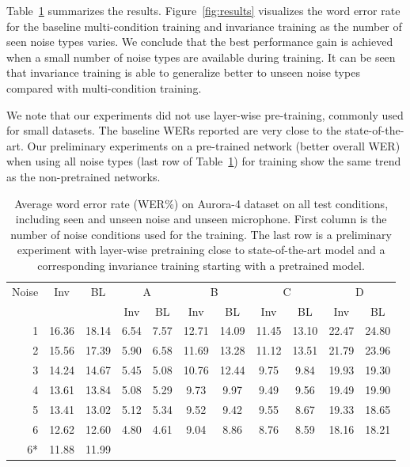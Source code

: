 \documentclass{article}
\begin{document}
Table~\ref{tab:results} summarizes the results. Figure~\ref{fig:results} visualizes the word error rate for the baseline multi-condition training and invariance training as the number of seen noise types varies. We conclude that the best performance
gain is achieved when a small number of noise types are available during training. It can be seen that invariance training is able to generalize better to unseen noise types compared with multi-condition training.

We note that our experiments did not use layer-wise pre-training, commonly used for small
datasets. The baseline WERs reported are very close to the state-of-the-art. %
Our preliminary experiments on a pre-trained network (better overall WER) when using all noise types (last row of Table~\ref{tab:results}) for training show the same trend as the non-pretrained networks.

\begin{table}
    \centering
    \caption{Average word error rate (WER\%) on Aurora-4 dataset on all test conditions,
        including seen and unseen noise and unseen microphone. First column
        is the number of noise conditions used for the training. The last row is a 
        preliminary experiment with layer-wise pretraining close to state-of-the-art
        model and a corresponding invariance training starting with a pretrained model.}
    \label{tab:results}
    \begin{tabular}{r|cc||cc|cc|cc|cc}
        Noise       &Inv&BL&  \multicolumn{2}{c|}{A} & \multicolumn{2}{c|}{B} & \multicolumn{2}{c|}{C} & \multicolumn{2}{c}{D}\\
               & & &  Inv & BL & Inv & BL & Inv & BL & Inv & BL\\
    \hline
    1           &16.36        &18.14 &6.54&7.57    &12.71& 14.09   & 11.45&   13.10    & 22.47 &   24.80    \\
    2           &15.56        &17.39 &5.90&  6.58 &   11.69   &13.28   &11.12   &13.51   &21.79   &23.96 \\
    3           &14.24        &14.67 &5.45 & 5.08&    10.76&   12.44&   9.75&    9.84 &   19.93&   19.30\\
    4           &13.61        &13.84 & 5.08 &5.29    &9.73    &9.97    &9.49    &9.56    &19.49   &19.90\\         
    5           &13.41        &13.02 & 5.12 &5.34    &9.52    &9.42    &9.55    &8.67    &19.33   &18.65\\         
    6           &12.62        &12.60 & 4.80 &4.61    &9.04    &8.86    &8.76    &8.59    &18.16   &18.21\\
    \hline\hline
    6* &11.88        &11.99
    \end{tabular}
\end{table}
\end{document}
